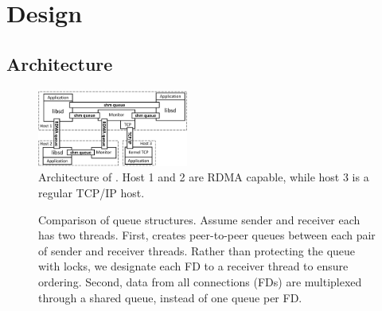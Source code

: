 \section{Design}
\label{sec:design}

\subsection{Architecture}
\label{subsec:architecture}

\begin{figure}[t!]
		\centering
		\includegraphics[width=0.44\textwidth]{images/architecture_new}
		\vspace{-5pt}
		\caption{Architecture of \sys{}. Host 1 and 2 are RDMA capable, while host 3 is a regular TCP/IP host.}
		\label{fig:architecture}
		\vspace{-10pt}
\end{figure}


\begin{figure}[t!]
	\centering
	\vspace{-5pt}
	\vspace{-5pt}
	\caption{Comparison of queue structures. Assume sender and receiver each has two threads. First, \sys{} creates peer-to-peer queues between each pair of sender and receiver threads. Rather than protecting the queue with locks, we designate each FD to a receiver thread to ensure ordering. Second, data from all connections (FDs) are multiplexed through a shared queue, instead of one queue per FD.}
	\label{fig:fork-rdwr}
	\vspace{-10pt}
\end{figure}


